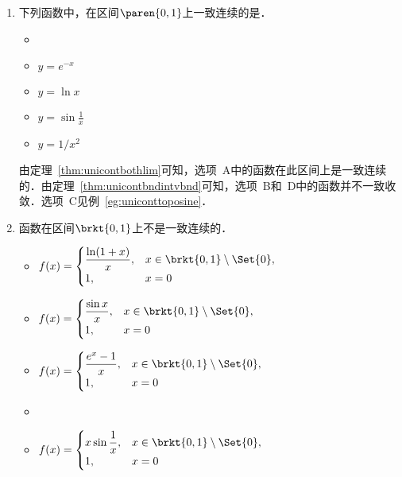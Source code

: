 \begin{enumerate}
\item 下列函数中，在区间\(\paren{0,1}\)上一致连续的是\uline{\makebox[6em]{}}．
  \begin{itemize}
    \renewcommand{\labelitemi}{\faCircleThin}
    \ifshowsol
  \item[\faCircle]
    \else
  \item
    \fi
    \(y = e^{-x}\)
  \item \(y = \ln x\)
  \item \(y = \sin\frac1x\)     %
  \item \(y = 1/x^2\)
  \end{itemize}

  \ifshowsol
  由定理~\ref{thm:unicontbothlim}可知，选项~A中的函数在此区间上是一致连续的．由定理~\ref{thm:unicontbndintvbnd}可知，选项~B和~D中的函数并不一致收敛．选项~C见例~\ref{eg:uniconttoposine}．
  \fi

\item 函数\uline{\hspace{10em}}在区间\(\brkt{0,1}\)上不是一致连续的．
  \begin{itemize}
    \renewcommand{\labelitemi}{\faCircleThin}
  \item
    \begin{math}
      f(x) =
      \begin{cases}
        \dfrac{\ln(1+x)}{x}, & x \in \brkt{0,1} \setminus \Set{0}, \\
        1, & x = 0
      \end{cases}
    \end{math}
  \item
    \begin{math}
      f(x) =
      \begin{cases}
        \dfrac{\sin x}{x}, & x \in \brkt{0,1} \setminus \Set{0}, \\
        1, & x = 0
      \end{cases}
    \end{math}
  \item
    \begin{math}
      f(x) =
      \begin{cases}
        \dfrac{e^x-1}{x}, & x \in \brkt{0,1} \setminus \Set{0}, \\
        1, & x = 0
      \end{cases}
    \end{math}
    \ifshowsol
  \item[\faCircle]
    \else
  \item
    \fi
    \begin{math}
      f(x) =
      \begin{cases}
        x \sin\dfrac1x, & x \in \brkt{0,1} \setminus \Set{0}, \\
        1, & x = 0
      \end{cases}
    \end{math}
  \end{itemize}


\end{enumerate}
